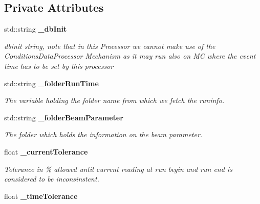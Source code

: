 \subsection*{Private Attributes}
\begin{DoxyCompactItemize}
\item 
std::string {\bf \_\-dbInit}\label{classmarlin_1_1RunInfoProcessor_a65053a1bdf8789ad7285a32739a69807}

\begin{DoxyCompactList}\small\item\em dbinit string, note that in this Processor we cannot make use of the ConditionsDataProcessor Mechanism as it may run also on MC where the event time has to be set by this processor \item\end{DoxyCompactList}\item 
std::string {\bf \_\-folderRunTime}\label{classmarlin_1_1RunInfoProcessor_aeb0c70371d7b4e0cd37581188894103e}

\begin{DoxyCompactList}\small\item\em The variable holding the folder name from which we fetch the runinfo. \item\end{DoxyCompactList}\item 
std::string {\bf \_\-folderBeamParameter}\label{classmarlin_1_1RunInfoProcessor_adbdb31a2fc1c90aa15700d0906a15b15}

\begin{DoxyCompactList}\small\item\em The folder which holds the information on the beam parameter. \item\end{DoxyCompactList}\item 
float {\bf \_\-currentTolerance}\label{classmarlin_1_1RunInfoProcessor_aab826ec0a4e9dde1f2b2d4e9a079ee22}

\begin{DoxyCompactList}\small\item\em Tolerance in \% allowed until current reading at run begin and run end is considered to be inconsinstent. \item\end{DoxyCompactList}\item 
float {\bf \_\-timeTolerance}\label{classmarlin_1_1RunInfoProcessor_abdd63cb1e6b5a847089182c30929ccb8}


\end{DoxyCompactItemize}
